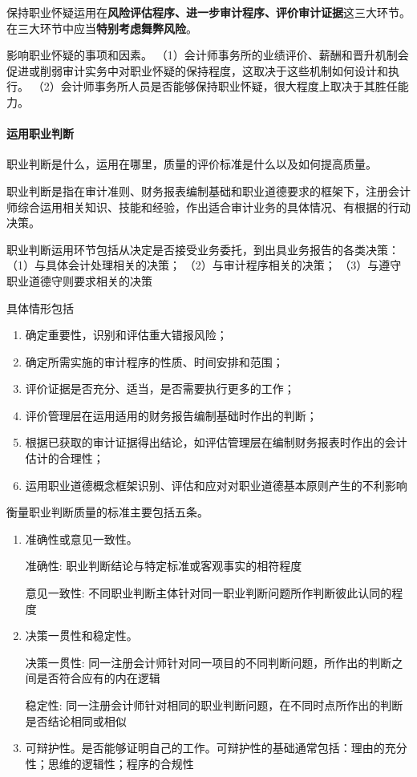 \documentclass[UTF8,12pt]{ctexart}
\numberwithin{equation}{section} %
\numberwithin{figure}{section}
\numberwithin{table}{section}
\begin{document}
	保持职业怀疑运用在\textbf{风险评估程序、进一步审计程序、评价审计证据}这三大环节。在三大环节中应当\textbf{特别考虑舞弊风险}。
	
	影响职业怀疑的事项和因素。
	（1）会计师事务所的业绩评价、薪酬和晋升机制会促进或削弱审计实务中对职业怀疑的保持程度，这取决于这些机制如何设计和执行。
	（2）会计师事务所人员是否能够保持职业怀疑，很大程度上取决于其胜任能力。
	
	\paragraph{运用职业判断}
	职业判断是什么，运用在哪里，质量的评价标准是什么以及如何提高质量。
	
	职业判断是指在审计准则、财务报表编制基础和职业道德要求的框架下，注册会计师综合运用相关知识、技能和经验，作出适合审计业务的具体情况、有根据的行动决策。
	
	职业判断运用环节包括从决定是否接受业务委托，到出具业务报告的各类决策：
	（1）与具体会计处理相关的决策；
	（2）与审计程序相关的决策；
	（3）与遵守职业道德守则要求相关的决策
	
	具体情形包括
	\begin{enumerate}
		\item 确定重要性，识别和评估重大错报风险；

		\item 确定所需实施的审计程序的性质、时间安排和范围；

		\item 评价证据是否充分、适当，是否需要执行更多的工作；

		\item 评价管理层在运用适用的财务报告编制基础时作出的判断；

		\item 根据已获取的审计证据得出结论，如评估管理层在编制财务报表时作出的会计估计的合理性；

		\item 运用职业道德概念框架识别、评估和应对对职业道德基本原则产生的不利影响
	\end{enumerate}
	
	衡量职业判断质量的标准主要包括五条。
	\begin{enumerate}
		\item 准确性或意见一致性。
		
		准确性:
		职业判断结论与特定标准或客观事实的相符程度
		
		意见一致性:
		不同职业判断主体针对同一职业判断问题所作判断彼此认同的程度
		
		\item 决策一贯性和稳定性。
		
		决策一贯性:
		同一注册会计师针对同一项目的不同判断问题，所作出的判断之间是否符合应有的内在逻辑
		
		稳定性:
		同一注册会计师针对相同的职业判断问题，在不同时点所作出的判断是否结论相同或相似
		
		\item 可辩护性。是否能够证明自己的工作。可辩护性的基础通常包括：理由的充分性；思维的逻辑性；程序的合规性
	\end{enumerate}
	
\end{document}
